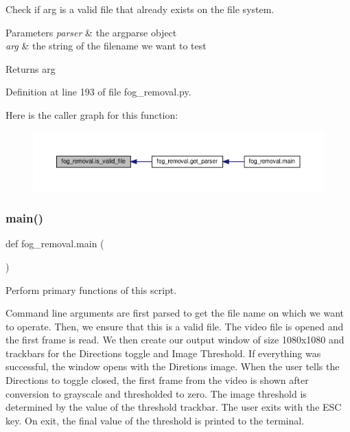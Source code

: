 Check if arg is a valid file that already exists on the file system. 


\begin{DoxyParams}{Parameters}
{\em parser} & the argparse object \\
\hline
{\em arg} & the string of the filename we want to test\\
\hline
\end{DoxyParams}
\begin{DoxyReturn}{Returns}
arg 
\end{DoxyReturn}


Definition at line 193 of file fog\+\_\+removal.\+py.

Here is the caller graph for this function\+:\nopagebreak
\begin{figure}[H]
\begin{center}
\leavevmode
\includegraphics[width=350pt]{namespacefog__removal_a7b07384f6a6ff8498e14f3aa5f8e2252_icgraph}
\end{center}
\end{figure}
\mbox{\label{namespacefog__removal_a427a577da8405e5624962d7ef722aadf}} 
\subsubsection{\texorpdfstring{main()}{main()}}
{\footnotesize\ttfamily def fog\+\_\+removal.\+main (\begin{DoxyParamCaption}{ }\end{DoxyParamCaption})}



Perform primary functions of this script. 

Command line arguments are first parsed to get the file name on which we want to operate. Then, we ensure that this is a valid file. The video file is opened and the first frame is read. We then create our output window of size 1080x1080 and trackbars for the Directions toggle and Image Threshold. If everything was successful, the window opens with the Diretions image. When the user tells the Directions to toggle closed, the first frame from the video is shown after conversion to grayscale and thresholded to zero. The image threshold is determined by the value of the threshold trackbar. The user exits with the E\+SC key. On exit, the final value of the threshold is printed to the terminal. 

